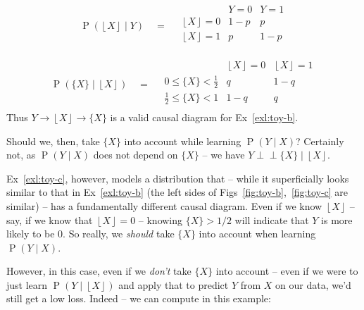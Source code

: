 \documentclass[12pt]{article}
\newcommand{\ci}{\perp\!\!\!\perp}
\newcommand{\Prob}[1]{\operatorname{P}\left(#1\right)}
\newcommand{\floor}[1]{\left\lfloor #1 \right\rfloor}
\theoremstyle{definition}
\numberwithin{equation}{section}
\numberwithin{figure}{section}
\numberwithin{table}{section}
\begin{document}
\begin{equation*}
    \Prob{\floor{X}\mid Y} \,\,\,\,\,\, = \,\,\,\,\,\,
    \begin{array}{l|rr}
         & Y=0 & Y=1 \\
         \hline
         \floor{X}=0 & 1-p & p \\
         \floor{X}=1 & p & 1-p \\
    \end{array} 
\end{equation*}

\begin{equation*}
    \Prob{\{X\}\mid \floor{X}} \,\,\,\,\,\, = \,\,\,\,\,\,
    \begin{array}{l|rr}
         & \floor{X}=0 & \floor{X}=1 \\
         \hline
         0 \le \{X\} < \frac12 & q & 1-q \\
         \frac12 \le \{X\} < 1 & 1-q &  q \\
    \end{array} 
\end{equation*}
Thus $Y\longrightarrow \floor{X} \longrightarrow \{X\}$ is a valid causal diagram for Ex~\ref{exl:toy-b}. 

Should we, then, take $\{X\}$ into account while learning $\Prob{Y\mid X}$? Certainly not, as $\Prob{Y\mid X}$ does not depend on $\{X\}$ -- we have $Y\ci \{X\}\mid\floor{X}$.

Ex~\ref{exl:toy-c}, however, models a distribution that -- while it superficially looks similar to that in Ex~\ref{exl:toy-b} (the left sides of Figs~\ref{fig:toy-b},~\ref{fig:toy-c} are similar) -- has a fundamentally different causal diagram. Even if we know $\floor{X}$ -- say, if we know that $\floor{X}=0$ -- knowing $\{X\}>1/2$ will indicate that $Y$ is more likely to be 0. So really, we \emph{should} take $\{X\}$ into account when learning $\Prob{Y\mid X}$. 

However, in this case, even if we \emph{don't} take $\{X\}$ into account -- even if we were to just learn $\Prob{Y\mid\floor{X}}$ and apply that to predict $Y$ from $X$ on our data, we'd still get a low loss. Indeed -- we can compute in this example:
\end{document}
